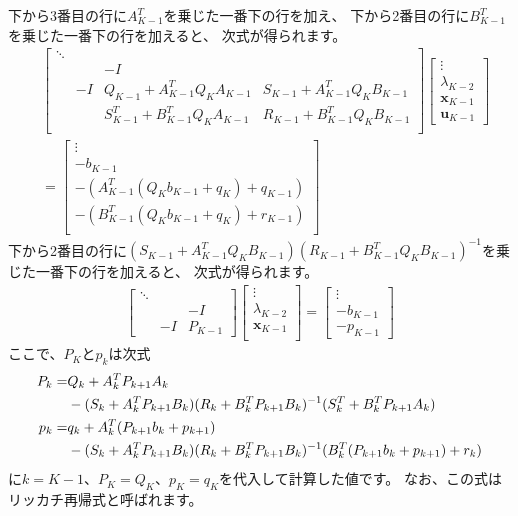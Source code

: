 \documentclass[a4paper]{jarticle}
\begin{document}
下から3番目の行に$A_{K-1}^T$を乗じた一番下の行を加え、
下から2番目の行に$B_{K-1}^T$を乗じた一番下の行を加えると、
次式が得られます。
\begin{align*}
&\begin{bmatrix}
 \ddots& &  & \\
 & & -I & \\
 &-I &  Q_{K-1} +A_{K-1}^TQ_{K}A_{K-1} & S_{K-1} + A_{K-1}^TQ_{K}B_{K-1} \\
 &  &  S_{K-1}^T + B_{K-1}^TQ_{K}A_{K-1} & R_{K-1}  + B_{K-1}^TQ_{K}B_{K-1}   \\
\end{bmatrix}
\begin{bmatrix}
\vdots\\
\lambda_{K-2}\\
\mathbf{x}_{K-1}\\
\mathbf{u}_{K-1}
\end{bmatrix}
\\
&=
\begin{bmatrix}
\vdots\\
-b_{K-1}\\
-(A^T_{K-1}(Q_Kb_{K-1}+q_{K}) + q_{K-1})\\
-(B^T_{K-1}(Q_Kb_{K-1}+q_{K}) + r_{K-1})\\
\end{bmatrix}
\end{align*}
下から2番目の行に$(S_{K-1} + A_{K-1}^TQ_{K}B_{K-1})(R_{K-1}  + B_{K-1}^TQ_{K}B_{K-1})^{-1}$を乗じた一番下の行を加えると、
次式が得られます。
\begin{align}
\begin{bmatrix}
\ddots & &\\
&  &  -I\\
& -I &  P_{K-1}
\end{bmatrix}
\begin{bmatrix}
\vdots\\
\lambda_{K-2}\\
\mathbf{x}_{K-1}\\
\end{bmatrix}
=
\begin{bmatrix}
\vdots\\
-b_{K-1}\\
-p_{K-1}
\end{bmatrix}
\label{eq:kkt_system_after_riccati_recursion}
\end{align}
ここで、$P_K$と$p_k$は次式
\begin{align}
P_{k} =& Q_{k} +A_{k}^TP_{k+1}A_{k} 
\notag
\\
&- (S_{k} + A_{k}^TP_{k+1}B_{k})(R_{k}  + B_{k}^TP_{k+1}B_{k})^{-1}(S_{k}^T + B_{k}^TP_{k+1}A_{k})
\label{eq:riccati_recursion_matrix}
\\
p_{k} =& q_{k} +A^T_{k}(P_{k+1}b_{k}+p_{k+1})
\notag
\\
&- (S_{k} + A_{k}^TP_{k+1}B_{k})(R_{k}  + B_{k}^TP_{k+1}B_{k})^{-1}(B^T_{k}(P_{k+1}b_{k}+p_{k+1}) + r_{k})
\label{eq:riccati_recursion_vector}
\end{align}
に$k=K-1$、$P_K=Q_K$、$p_K=q_K$を代入して計算した値です。
なお、この式はリッカチ再帰式と呼ばれます。
\end{document}

